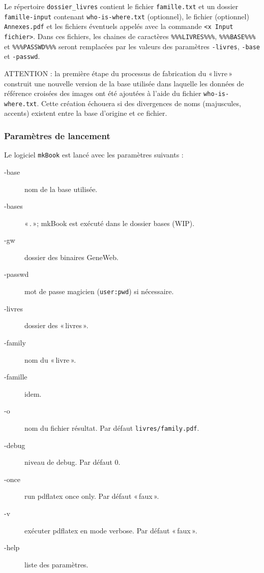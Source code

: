 Le répertoire \verb|dossier_livres| contient le fichier \verb|famille.txt|
et un dossier
\verb|famille-input| contenant \verb|who-is-where.txt| (optionnel),
le fichier (optionnel) \verb|Annexes.pdf|
et les fichiers éventuels appelés avec la commande \verb|<x Input fichier>|.
Dans ces fichiers, les chaines de caractères \verb|%%%LIVRES%%%|,
\verb|%%%BASE%%%| et \verb|%%%PASSWD%%%| seront remplacées par les valeurs
des paramètres \verb|-livres|, \verb|-base| et \verb|-passwd|.

ATTENTION : la première étape du processus de fabrication du «\,livre\,»
construit une nouvelle version de la base utilisée dans laquelle les
données de référence croisées des images ont été ajoutées à l'aide du
fichier \verb|who-is-where.txt|.
Cette création échouera si des divergences de noms (majuscules, accents)
existent entre la base d'origine et ce fichier.

\subsubsection{Paramètres de lancement}

Le logiciel \verb|mkBook| est lancé avec les paramètres suivants :
\begin{description}
\item[-base] nom de la base utilisée.
\item[-bases] «\,.\,»; mkBook est exécuté dans le dossier bases (WIP).
\item[-gw] dossier des binaires GeneWeb.
\item[-passwd] mot de passe magicien (\verb|user:pwd|) si nécessaire.
\item[-livres] dossier des «\,livres\,».
\item[-family] nom du «\,livre\,».
\item[-famille] idem.
\item[-o] nom du fichier résultat. Par défaut \verb|livres/family.pdf|.
\item[-debug] niveau de debug. Par défaut 0.
\item[-once] run pdflatex once only. Par défaut «\,faux\,».
\item[-v] exécuter pdflatex en mode verbose. Par défaut «\,faux\,».
\item[-help] liste des paramètres.
\end{description}

